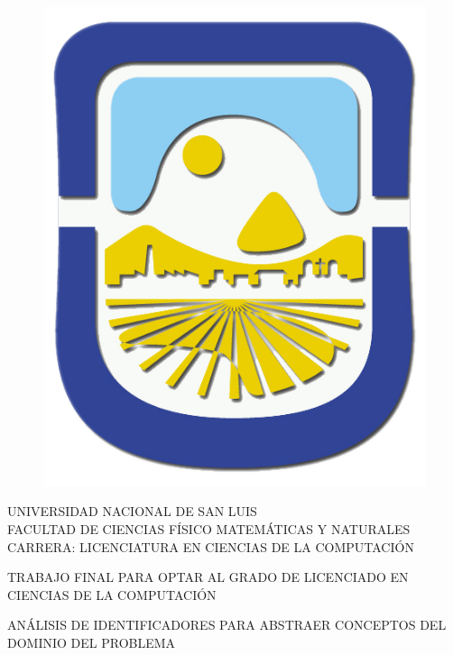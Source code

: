 \enlargethispage{\baselineskip}%
\enlargethispage{\baselineskip}
\enlargethispage{\baselineskip}

\begin{titlepage}

{\small\centering

\begin{figure}[h!]
\centerline{%
\includegraphics[scale= 0.15]{./init/unsl_logo.png}} 
\end{figure}  

UNIVERSIDAD NACIONAL DE SAN LUIS\\
FACULTAD DE CIENCIAS FÍSICO MATEMÁTICAS Y NATURALES\\
CARRERA: LICENCIATURA EN CIENCIAS DE LA COMPUTACIÓN
}
\vskip1cm  
\vskip1cm  

{\bfseries\centering

TRABAJO FINAL PARA OPTAR AL GRADO DE LICENCIADO EN CIENCIAS DE LA COMPUTACIÓN
\vskip0.5cm
}

    \centering
    {\bfseries\LARGE    
    \vskip1cm  
      
  ANÁLISIS DE IDENTIFICADORES PARA ABSTRAER CONCEPTOS DEL DOMINIO DEL PROBLEMA
     \vskip0.8cm       
   }


\end{titlepage}
